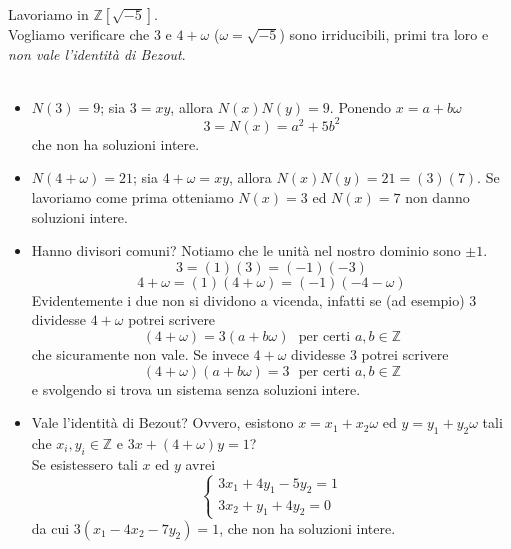\begin{esercizio}
Lavoriamo in $\mathbb{Z}[\sqrt{-5}]$. \\ Vogliamo verificare che 3 e $4+\omega$ ($\omega=\sqrt{-5}$) sono irriducibili, primi tra loro e \textit{non vale l'identità di Bezout}. \\ \\
\begin{itemize}
	\item $N(3)=9$; sia $3=xy$, allora $N(x)N(y)=9$. Ponendo $x=a+b\omega$
	\begin{equation*}
	3=N(x)=a^2+5b^2
	\end{equation*}
	che non ha soluzioni intere.
	\item $N(4+\omega)=21$; sia $4+\omega=xy$, allora $N(x)N(y)=21=(3)(7)$. Se lavoriamo come prima otteniamo $N(x)=3$ ed $N(x)=7$ non danno soluzioni intere.
	\item Hanno divisori comuni? Notiamo che le unità nel nostro dominio sono $\pm1$.
	\begin{equation*}
	3=(1)(3)=(-1)(-3)
	\end{equation*}
	\begin{equation*}
	4+\omega=(1)(4+\omega)=(-1)(-4-\omega)
	\end{equation*}
	Evidentemente i due non si dividono a vicenda, infatti se (ad esempio) 3 dividesse $4+\omega$ potrei scrivere
	\begin{equation*}
	(4+\omega)=3(a+b\omega) \ \ \ \text{per certi $a,b\in\mathbb{Z}$}
	\end{equation*}
	che sicuramente non vale. Se invece $4+\omega$ dividesse 3 potrei scrivere
	\begin{equation*}
	(4+\omega)(a+b\omega)=3 \ \ \ \text{per certi $a,b\in\mathbb{Z}$}
	\end{equation*}
	e svolgendo si trova un sistema senza soluzioni intere.
	\item Vale l'identità di Bezout? Ovvero, esistono $x=x_1+x_2\omega$ ed $y=y_1+y_2\omega$ tali che $x_i,y_i\in\mathbb{Z}$ e $3x+(4+\omega)y=1$?\\ Se esistessero tali $x$ ed $y$ avrei
	\begin{equation*}
		\begin{cases}
			3x_1+4y_1-5y_2=1\\
			3x_2+y_1+4y_2=0
		\end{cases}
	\end{equation*}
	da cui $3(x_1-4x_2-7y_2)=1$, che non ha soluzioni intere.
\end{itemize}
\end{esercizio}
